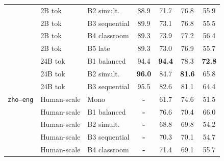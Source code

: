 \begin{table}[t]
\begin{minipage}[t]{0.49\linewidth}
\begin{tabular}{ll l cc cc}
 & 2B tok & B2 simult. & \cellcolor[rgb]{0.785,1.000,0.785} 88.9 & \cellcolor[rgb]{0.882,1.000,0.882} 71.7 & \cellcolor[rgb]{0.810,1.000,0.810} 76.8 & \cellcolor[rgb]{0.951,1.000,0.951} 55.9 \\
 & 2B tok & B3 sequential & \cellcolor[rgb]{0.779,1.000,0.779} 89.9 & \cellcolor[rgb]{0.874,1.000,0.874} 73.1 & \cellcolor[rgb]{0.810,1.000,0.810} 76.8 & \cellcolor[rgb]{0.955,1.000,0.955} 55.5 \\
 & 2B tok & B4 classroom & \cellcolor[rgb]{0.783,1.000,0.783} 89.3 & \cellcolor[rgb]{0.870,1.000,0.870} 73.9 & \cellcolor[rgb]{0.807,1.000,0.807} 77.2 & \cellcolor[rgb]{0.947,1.000,0.947} 56.4 \\
 & 2B tok & B5 late & \cellcolor[rgb]{0.783,1.000,0.783} 89.3 & \cellcolor[rgb]{0.875,1.000,0.875} 73.0 & \cellcolor[rgb]{0.809,1.000,0.809} 76.9 & \cellcolor[rgb]{0.953,1.000,0.953} 55.7 \\
\addlinespace[1.5pt]
 & 24B tok & B1 balanced & \cellcolor[rgb]{0.754,1.000,0.754} 94.4 & \cellcolor[rgb]{0.758,1.000,0.758} \textbf{94.4} & \cellcolor[rgb]{0.799,1.000,0.799} 78.3 & \cellcolor[rgb]{0.812,1.000,0.812} \textbf{72.8} \\
 & 24B tok & B2 simult. & \cellcolor[rgb]{0.745,1.000,0.745} \textbf{96.0} & \cellcolor[rgb]{0.811,1.000,0.811} 84.7 & \cellcolor[rgb]{0.775,1.000,0.775} \textbf{81.6} & \cellcolor[rgb]{0.870,1.000,0.870} 65.8 \\
 & 24B tok & B3 sequential & \cellcolor[rgb]{0.748,1.000,0.748} 95.5 & \cellcolor[rgb]{0.822,1.000,0.822} 82.6 & \cellcolor[rgb]{0.779,1.000,0.779} 81.1 & \cellcolor[rgb]{0.881,1.000,0.881} 64.4 \\
\midrule
\texttt{zho--eng} & Human-scale & Mono & \textbf{-} & \cellcolor[rgb]{0.936,1.000,0.936} 61.7 & \cellcolor[rgb]{0.825,1.000,0.825} 74.6 & \cellcolor[rgb]{0.988,1.000,0.988} 51.5 \\
 & Human-scale & B1 balanced & \textbf{-} & \cellcolor[rgb]{0.855,1.000,0.855} 76.6 & \cellcolor[rgb]{0.855,1.000,0.855} 70.4 & \cellcolor[rgb]{0.868,1.000,0.868} 66.0 \\
 & Human-scale & B2 simult. & \textbf{-} & \cellcolor[rgb]{0.897,1.000,0.897} 68.8 & \cellcolor[rgb]{0.859,1.000,0.859} 69.8 & \cellcolor[rgb]{0.965,1.000,0.965} 54.2 \\
 & Human-scale & B3 sequential & \textbf{-} & \cellcolor[rgb]{0.889,1.000,0.889} 70.3 & \cellcolor[rgb]{0.857,1.000,0.857} 70.1 & \cellcolor[rgb]{0.961,1.000,0.961} 54.7 \\
 & Human-scale & B4 classroom & \textbf{-} & \cellcolor[rgb]{0.883,1.000,0.883} 71.4 & \cellcolor[rgb]{0.864,1.000,0.864} 69.1 & \cellcolor[rgb]{0.953,1.000,0.953} 55.7 \\

\end{tabular}
\end{minipage}
\end{table}
